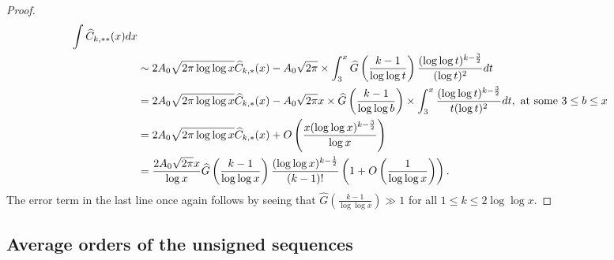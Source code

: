 \documentclass[11pt,reqno,a4letter]{article}
\numberwithin{figure}{section}
\numberwithin{table}{section}
\theoremstyle{plain}
\numberwithin{theorem}{section}
\theoremstyle{definition}
\begin{document}
\begin{proof}
\begin{align}
     \int \widehat{C}_{k,\ast\ast}(x)dx \\ 
\notag
     & \sim 2A_0 \sqrt{2\pi \log\log x} \widehat{C}_{k,\ast}(x) - 
     A_0\sqrt{2\pi} \times \int_3^x \widehat{G}\left(\frac{k-1}{\log\log t}\right) 
     \frac{(\log\log t)^{k-\frac{3}{2}}}{(\log t)^2} dt \\ 
\notag
     & = 2A_0 \sqrt{2\pi \log\log x} \widehat{C}_{k,\ast}(x) 
     - A_0\sqrt{2\pi} x \times \widehat{G}\left(\frac{k-1}{\log\log b}\right) \times 
     \int_3^x \frac{(\log\log t)^{k-\frac{3}{2}}}{t (\log t)^2} dt, 
     \text{ at some } 3 \leq b \leq x \\ 
\notag 
     & = 2A_0 \sqrt{2\pi \log\log x} \widehat{C}_{k,\ast}(x) + 
     O\left(\frac{x (\log\log x)^{k-\frac{3}{2}}}{\log x}\right) \\ 
\notag 
     & = 
     \frac{2A_0 \sqrt{2\pi} x}{\log x} 
     \widehat{G}\left(\frac{k-1}{\log\log x}\right) 
     \frac{(\log\log x)^{k-\frac{1}{2}}}{(k-1)!} \left( 
     1 + O\left(\frac{1}{\log\log x}\right)\right). 
\end{align}
The error term in the last line once again follows by seeing that 
$\widehat{G}\left(\frac{k-1}{\log\log x}\right) \gg 1$ for all 
$1 \leq k \leq 2\log\log x$. 
\end{proof}

\subsection{Average orders of the unsigned sequences}
\label{subSection_AvgOrdersOfTheUnsignedSequences} 
\end{document}
